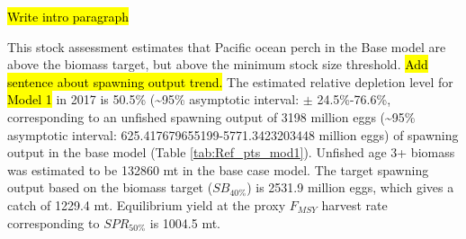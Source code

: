 \documentclass[12pt,]{article}
\begin{document}
\hl{Write intro paragraph}

This stock assessment estimates that Pacific ocean perch in the Base
model are above the biomass target, but above the minimum stock size
threshold. \hl{Add sentence about spawning output trend.} The estimated
relative depletion level for \hl{Model 1} in 2017 is 50.5\%
(\textasciitilde{}95\% asymptotic interval: \(\pm\) 24.5\%-76.6\%,
corresponding to an unfished spawning output of 3198 million eggs
(\textasciitilde{}95\% asymptotic interval:
625.417679655199-5771.3423203448 million eggs) of spawning output in the
base model (Table \ref{tab:Ref_pts_mod1}). Unfished age 3+ biomass was
estimated to be 132860 mt in the base case model. The target spawning
output based on the biomass target (\(SB_{40\%}\)) is 2531.9 million
eggs, which gives a catch of 1229.4 mt. Equilibrium yield at the proxy
\(F_{MSY}\) harvest rate corresponding to \(SPR_{50\%}\) is 1004.5 mt.

\FloatBarrier
\end{document}

